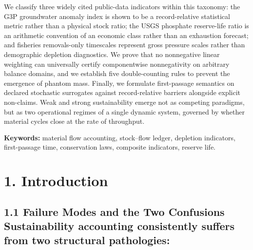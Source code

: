 \documentclass[11pt]{article}
\begin{document}
We classify three widely cited public-data indicators within this taxonomy: the G3P groundwater anomaly index is shown to be a record-relative statistical metric rather than a physical stock ratio; the USGS phosphate reserve-life ratio is an arithmetic convention of an economic class rather than an exhaustion forecast; and fisheries removals-only timescales represent gross pressure scales rather than demographic depletion diagnostics. We prove that no nonnegative linear weighting can universally certify componentwise nonnegativity on arbitrary balance domains, and we establish five double-counting rules to prevent the emergence of phantom mass. Finally, we formulate first-passage semantics on declared stochastic surrogates against record-relative barriers alongside explicit non-claims. Weak and strong sustainability emerge not as competing paradigms, but as two operational regimes of a single dynamic system, governed by whether material cycles close at the rate of throughput.

\textbf{Keywords:} material flow accounting, stock--flow ledger, depletion indicators, first-passage time, conservation laws, composite indicators, reserve life.

\vspace{0.8em}

\section*{1. Introduction}\label{introduction}

\subsection*{1.1 Failure Modes and the Two Confusions Sustainability accounting consistently suffers from two structural pathologies:}\label{11-failure-modes-and-the-two-confusions}
\end{document}
